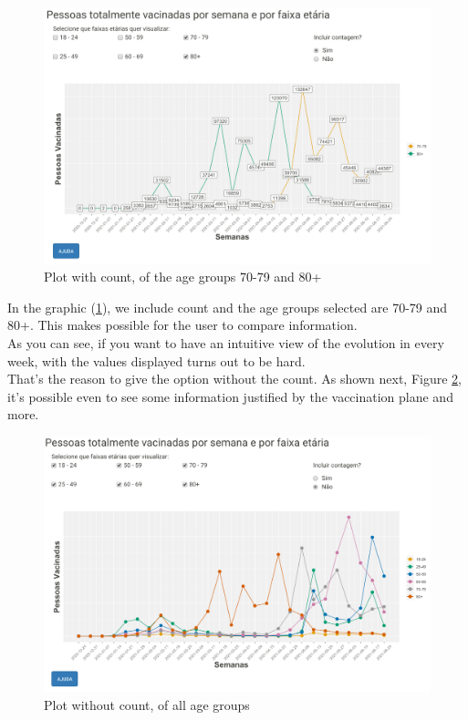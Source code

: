 \begin{figure}[H]
\centering
\includegraphics[width=\textwidth]{images/p2.png}
\caption{Plot with count, of the age groups 70-79 and 80+}
\label{fig:ages-vac-3}
\end{figure}
In the graphic (\ref{fig:ages-vac-3}), we include count and the age groups selected are 70-79 and 80+. This makes possible for the user to compare information.\\
As you can see, if you want to have an intuitive view of the evolution in every week, with the values displayed turns out to be hard.\\
That's the reason to give the option without the count. As shown next, Figure \ref{fig:ages-vac-4},  it's possible even to see some information justified by the vaccination plane and more. 

\begin{figure}[H]
\centering
\includegraphics[width=\textwidth]{images/p4.png}
\caption{Plot without count, of all age groups}
\label{fig:ages-vac-4}
\end{figure}

